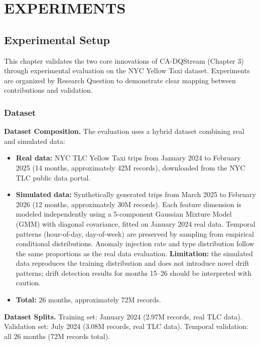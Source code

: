 \newpage
\chapter{EXPERIMENTS}
\pagestyle{fancy}

\section{Experimental Setup}

This chapter validates the two core innovations of CA-DQStream (Chapter 3) through experimental evaluation on the NYC Yellow Taxi dataset. Experiments are organized by Research Question to demonstrate clear mapping between contributions and validation.

\subsection{Dataset}
\label{sec:dataset}

\textbf{Dataset Composition.} The evaluation uses a hybrid dataset combining real and simulated data:

\begin{itemize}
    \item \textbf{Real data:} NYC TLC Yellow Taxi trips from January 2024 to February 2025 (14 months, approximately 42M records), downloaded from the NYC TLC public data portal.
    \item \textbf{Simulated data:} Synthetically generated trips from March 2025 to February 2026 (12 months, approximately 30M records). Each feature dimension is modeled independently using a 5-component Gaussian Mixture Model (GMM) with diagonal covariance, fitted on January 2024 real data. Temporal patterns (hour-of-day, day-of-week) are preserved by sampling from empirical conditional distributions. Anomaly injection rate and type distribution follow the same proportions as the real data evaluation. \textbf{Limitation:} the simulated data reproduces the training distribution and does not introduce novel drift patterns; drift detection results for months 15--26 should be interpreted with caution.
    \item \textbf{Total:} 26 months, approximately 72M records.
\end{itemize}

\textbf{Dataset Splits.} Training set: January 2024 (2.97M records, real TLC data). Validation set: July 2024 (3.08M records, real TLC data). Temporal validation: all 26 months (72M records total).

